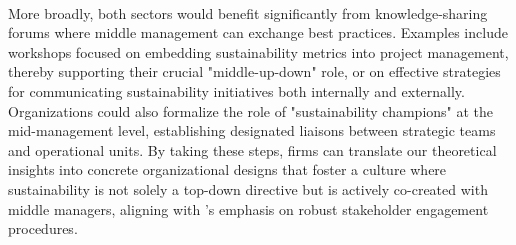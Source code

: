 	\paragraph*{} More broadly, both sectors would benefit significantly from knowledge-sharing forums where middle management can exchange best practices. Examples include workshops focused on embedding sustainability metrics into project management, thereby supporting their crucial "middle-up-down" role, or on effective strategies for communicating sustainability initiatives both internally and externally. Organizations could also formalize the role of "sustainability champions" at the mid-management level, establishing designated liaisons between strategic teams and operational units. By taking these steps, firms can translate our theoretical insights into concrete organizational designs that foster a culture where sustainability is not solely a top-down directive but is actively co-created with middle managers, aligning with \citeauthor{Eccles2014}'s emphasis on robust stakeholder engagement procedures.
	
